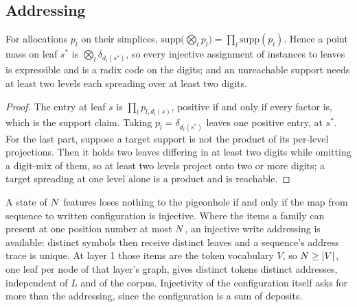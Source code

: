 \subsection{Addressing}

\begin{lemma}
\label{lem:radix}
For allocations $p_l$ on their simplices, $\mathrm{supp}\big(\bigotimes_l p_l\big) = \prod_l \mathrm{supp}(p_l)$. Hence a point mass on leaf $s^\ast$ is $\bigotimes_l \delta_{d_l(s^\ast)}$, so every injective assignment of instances to leaves is expressible and is a radix code on the digits; and an unreachable support needs at least two levels each spreading over at least two digits.
\end{lemma}

\begin{proof}
The entry at leaf $s$ is $\prod_l p_{l,d_l(s)}$, positive if and only if every factor is, which is the support claim. Taking $p_l = \delta_{d_l(s^\ast)}$ leaves one positive entry, at $s^\ast$. For the last part, suppose a target support is not the product of its per-level projections. Then it holds two leaves differing in at least two digits while omitting a digit-mix of them, so at least two levels project onto two or more digits; a target spreading at one level alone is a product and is reachable.
\end{proof}

\begin{lemma}
\label{lem:inject}
A state of $N$ features loses nothing to the pigeonhole if and only if the map from sequence to written configuration is injective. Where the items a family can present at one position number at most $N$, an injective write addressing is available: distinct symbols then receive distinct leaves and a sequence's address trace is unique. At layer 1 those items are the token vocabulary $V$, so $N \ge |V|$, one leaf per node of that layer's graph, gives distinct tokens distinct addresses, independent of $L$ and of the corpus. Injectivity of the configuration itself asks for more than the addressing, since the configuration is a sum of deposits.
\end{lemma}

